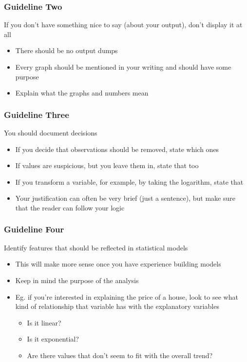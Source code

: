 \documentclass[12pt, block=fill]{beamer}
\begin{document}
\begin{frame}
  \frametitle{Guideline Two}
\begin{exampleblock}{If you don't have something nice to say (about your output), don't display it at all}
  \begin{itemize}
      \item There should be no output dumps
      \item Every graph should be mentioned in your writing and should have some purpose
      \item Explain what the graphs and numbers mean
  \end{itemize}
\end{exampleblock}
\end{frame}


\begin{frame}
  \frametitle{Guideline Three}
\begin{exampleblock}{You should document decisions}
  \begin{itemize}
      \item If you decide that observations should be removed, state which ones
      \item If values are suspicious, but you leave them in, state that too
      \item If you transform a variable, for example, by taking the logarithm, state that
      \item Your justification can often be very brief (just a sentence), but make sure that the reader can follow your logic
  \end{itemize}
\end{exampleblock}
\end{frame}



\begin{frame}
  \frametitle{Guideline Four}
  \begin{exampleblock}{Identify features that should be reflected in statistical models}
    \begin{itemize}
      \item This will make more sense once you have experience building models
      \item Keep in mind the purpose of the analysis
      \item Eg. if you're interested in explaining the price of a house, look to see what kind of relationship that variable has with the explanatory variables
        \begin{itemize}
          \item Is it linear?
          \item Is it exponential?
          \item Are there values that don't seem to fit with the overall trend?
        \end{itemize}
    \end{itemize}
  \end{exampleblock}
\end{frame}
\end{document}
